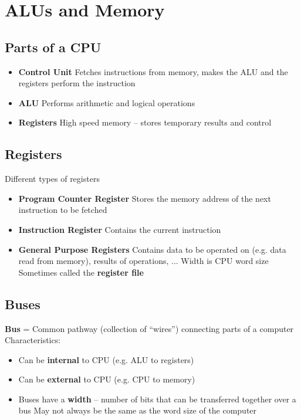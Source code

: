 \section{ALUs and Memory}
\subsection{Parts of a CPU}
\begin{itemize}
	\item\textbf{Control Unit}
	\subitem Fetches instructions from memory, makes the ALU and the registers perform the instruction
	\item\textbf{ALU}
	\subitem Performs arithmetic and logical operations
	\item\textbf{Registers}
	\subitem High speed memory -- stores temporary results and control
\end{itemize}

\subsection{Registers}
Different types of registers
\begin{itemize}
	\item\textbf{Program Counter Register}
	\subitem Stores the memory address of the next instruction to be fetched
	\item\textbf{Instruction Register}
	\subitem Contains the current instruction
	\item\textbf{General Purpose Registers}
	\subitem Contains data to be operated on (e.g. data read from memory), results of operations, ...
	\subitem Width is CPU word size
	\subitem Sometimes called the \textbf{register file}
\end{itemize}

\subsection{Buses}
\textbf{Bus} = Common pathway (collection of ``wires'') connecting parts of a computer\\
Characteristics:
\begin{itemize}
	\item Can be \textbf{internal} to CPU (e.g. ALU to registers)
	\item Can be \textbf{external} to CPU (e.g. CPU to memory)
	\item Buses have a \textbf{width} -- number of bits that can be transferred together over a bus
	\subitem May not always be the same as the word size of the computer
\end{itemize}

